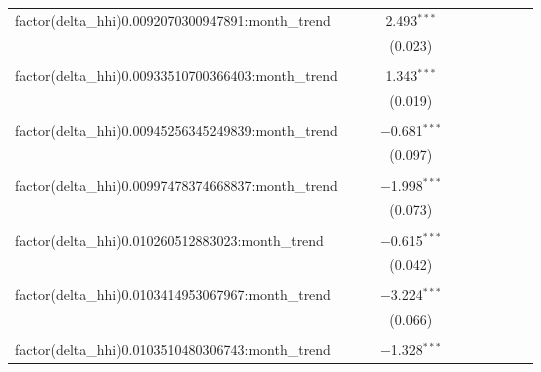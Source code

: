 \begin{table}[H]
{\begin{tabular}{@{\extracolsep{5pt}}lccccccccc}
  factor(delta\_hhi)0.0092070300947891:month\_trend &  &  & 2.493$^{***}$ &  &  &  &  &  &  \\  

   &  &  & (0.023) &  &  &  &  &  &  \\  

   & & & & & & & & & \\  

  factor(delta\_hhi)0.00933510700366403:month\_trend &  &  & 1.343$^{***}$ &  &  &  &  &  &  \\  

   &  &  & (0.019) &  &  &  &  &  &  \\  

   & & & & & & & & & \\  

  factor(delta\_hhi)0.00945256345249839:month\_trend &  &  & $-$0.681$^{***}$ &  &  &  &  &  &  \\  

   &  &  & (0.097) &  &  &  &  &  &  \\  

   & & & & & & & & & \\  

  factor(delta\_hhi)0.00997478374668837:month\_trend &  &  & $-$1.998$^{***}$ &  &  &  &  &  &  \\  

   &  &  & (0.073) &  &  &  &  &  &  \\  

   & & & & & & & & & \\  

  factor(delta\_hhi)0.010260512883023:month\_trend &  &  & $-$0.615$^{***}$ &  &  &  &  &  &  \\  

   &  &  & (0.042) &  &  &  &  &  &  \\  

   & & & & & & & & & \\  

  factor(delta\_hhi)0.0103414953067967:month\_trend &  &  & $-$3.224$^{***}$ &  &  &  &  &  &  \\  

   &  &  & (0.066) &  &  &  &  &  &  \\  

   & & & & & & & & & \\  

  factor(delta\_hhi)0.0103510480306743:month\_trend &  &  & $-$1.328$^{***}$ &  &  &  &  &  &  \\  


\end{tabular}}
\end{table}
